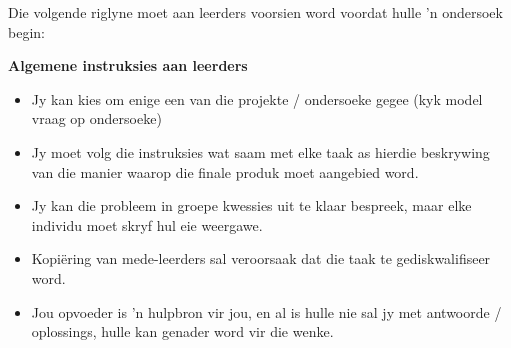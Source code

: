 Die volgende riglyne moet aan leerders voorsien word voordat hulle 'n ondersoek begin:

\textbf{Algemene instruksies aan leerders}
\begin{itemize}[noitemsep]
\item
  Jy kan kies om enige een van die projekte / ondersoeke gegee (kyk model vraag op ondersoeke)
\item
  Jy moet volg die instruksies wat saam met elke taak as hierdie beskrywing van die manier waarop die finale produk moet aangebied word.
\item
  Jy kan die probleem in groepe kwessies uit te klaar bespreek, maar elke individu moet skryf hul eie weergawe.
\item
  Kopiëring van mede-leerders sal veroorsaak dat die taak te gediskwalifiseer word.
\item
  Jou opvoeder is 'n hulpbron vir jou, en al is hulle nie sal jy met antwoorde / oplossings, hulle kan genader word vir die wenke.\end{itemize}	

